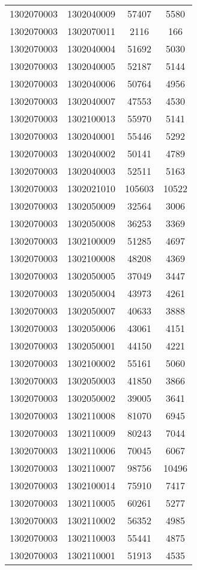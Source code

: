 \begin{longtable}[h]{llcc}
		1302070003 & 1302040009 & 57407 & 5580\\
		1302070003 & 1302070011 & 2116 & 166\\
		1302070003 & 1302040004 & 51692 & 5030\\
		1302070003 & 1302040005 & 52187 & 5144\\
		1302070003 & 1302040006 & 50764 & 4956\\
		1302070003 & 1302040007 & 47553 & 4530\\
		1302070003 & 1302100013 & 55970 & 5141\\
		1302070003 & 1302040001 & 55446 & 5292\\
		1302070003 & 1302040002 & 50141 & 4789\\
		1302070003 & 1302040003 & 52511 & 5163\\
		1302070003 & 1302021010 & 105603 & 10522\\
		1302070003 & 1302050009 & 32564 & 3006\\
		1302070003 & 1302050008 & 36253 & 3369\\
		1302070003 & 1302100009 & 51285 & 4697\\
		1302070003 & 1302100008 & 48208 & 4369\\
		1302070003 & 1302050005 & 37049 & 3447\\
		1302070003 & 1302050004 & 43973 & 4261\\
		1302070003 & 1302050007 & 40633 & 3888\\
		1302070003 & 1302050006 & 43061 & 4151\\
		1302070003 & 1302050001 & 44150 & 4221\\
		1302070003 & 1302100002 & 55161 & 5060\\
		1302070003 & 1302050003 & 41850 & 3866\\
		1302070003 & 1302050002 & 39005 & 3641\\
		1302070003 & 1302110008 & 81070 & 6945\\
		1302070003 & 1302110009 & 80243 & 7044\\
		1302070003 & 1302110006 & 70045 & 6067\\
		1302070003 & 1302110007 & 98756 & 10496\\
		1302070003 & 1302100014 & 75910 & 7417\\
		1302070003 & 1302110005 & 60261 & 5277\\
		1302070003 & 1302110002 & 56352 & 4985\\
		1302070003 & 1302110003 & 55441 & 4875\\
		1302070003 & 1302110001 & 51913 & 4535\\

\end{longtable}
